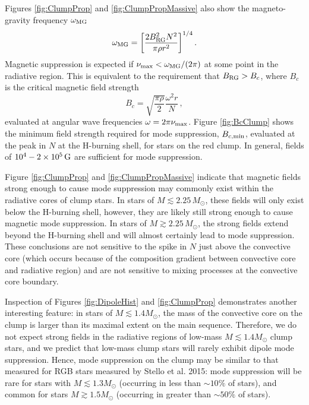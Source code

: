 Figures \ref{fig:ClumpProp} and \ref{fig:ClumpPropMassive} also show the magneto-gravity frequency $\omega_{\rm MG}$ \citep{Fuller_2015}
\begin{equation}
\label{eqn:omegaMG}
\omega_{\rm MG} = \bigg[ \frac{ 2 B_{\rm RG}^2 N^2}{\pi \rho r^2} \bigg]^{1/4} \, .
\end{equation}
Magnetic suppression is expected if $\nu_{\rm max} < \omega_{\rm MG}/(2 \pi)$ at some point in the radiative region. This is equivalent to the requirement that $B_{\rm RG} > B_c$, where $B_c$ is the critical magnetic field strength
\begin{equation}
\label{eqn:Bc}
B_c = \sqrt{ \frac{ \pi \rho}{2} } \frac{\omega^2 r}{N} \, ,
\end{equation}
evaluated at angular wave frequencies $\omega = 2 \pi \nu_{\rm max}$. Figure \ref{fig:BcClump} shows the minimum field strength required for mode suppression, $B_{c,{\rm min}}$, evaluated at the peak in $N$ at the H-burning shell, for stars on the red clump. In general, fields of $10^4-2 \times 10^5 \, {\rm G}$ are sufficient for mode suppression. 

Figure \ref{fig:ClumpProp} and \ref{fig:ClumpPropMassive} indicate that magnetic fields strong enough to cause mode suppression may commonly exist within the radiative cores of clump stars. In stars of $M \lesssim 2.25 \, M_\odot$, these fields will only exist below the H-burning shell, however, they are likely still strong enough to cause magnetic mode suppression. In stars of $M \gtrsim 2.25 \, M_\odot$, the strong fields extend beyond the H-burning shell and will almost certainly lead to mode suppression. These conclusions are not sensitive to the spike in $N$ just above the convective core (which occurs because of the composition gradient between convective core and radiative region) and are not sensitive to mixing processes at the convective core boundary. 

Inspection of Figures \ref{fig:DipoleHist} and \ref{fig:ClumpProp} demonstrates another interesting feature: in stars of $M \lesssim 1.4 M_\odot$, the mass of the convective core on the clump is larger than its maximal extent on the main sequence. Therefore, we do not expect strong fields in the radiative regions of low-mass $M \lesssim 1.4 M_\odot$ clump stars, and we predict that low-mass clump stars will rarely exhibit dipole mode suppression. Hence, mode suppression on the clump may be similar to that measured for RGB stars measured by Stello et al. 2015: mode suppression will be rare for stars with $M \lesssim 1.3 M_\odot$ (occurring in less than $\sim \! 10 \%$ of stars), and common for stars $M \gtrsim 1.5 M_\odot$ (occurring in greater than $\sim \! 50 \%$ of stars). 


    
  
  
  
  
  